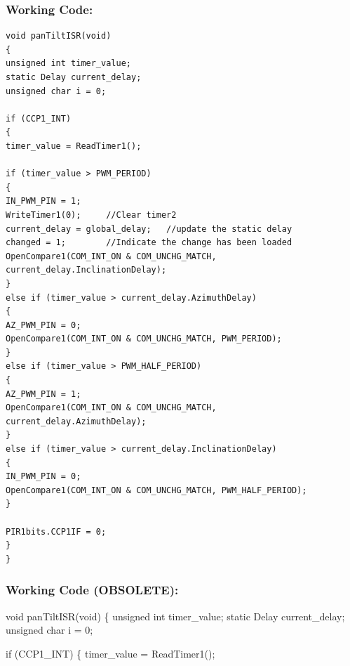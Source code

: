 \documentclass[]{report}
\begin{document}
\subsubsection{Working Code:}
\begin{lstlisting}
void panTiltISR(void)
{
unsigned int timer_value;
static Delay current_delay;
unsigned char i = 0;

if (CCP1_INT)
{
timer_value = ReadTimer1();

if (timer_value > PWM_PERIOD)
{
IN_PWM_PIN = 1;
WriteTimer1(0);     //Clear timer2
current_delay = global_delay;   //update the static delay
changed = 1;        //Indicate the change has been loaded
OpenCompare1(COM_INT_ON & COM_UNCHG_MATCH, current_delay.InclinationDelay);
}
else if (timer_value > current_delay.AzimuthDelay)
{
AZ_PWM_PIN = 0;
OpenCompare1(COM_INT_ON & COM_UNCHG_MATCH, PWM_PERIOD);
}
else if (timer_value > PWM_HALF_PERIOD)
{
AZ_PWM_PIN = 1;
OpenCompare1(COM_INT_ON & COM_UNCHG_MATCH, current_delay.AzimuthDelay);
}
else if (timer_value > current_delay.InclinationDelay)
{
IN_PWM_PIN = 0;
OpenCompare1(COM_INT_ON & COM_UNCHG_MATCH, PWM_HALF_PERIOD);
}

PIR1bits.CCP1IF = 0;
}
}
\end{lstlisting}

\subsubsection{Working Code (OBSOLETE):}
void panTiltISR(void)\newline
\{ \newline
	unsigned int timer\_value;\newline
	static Delay current\_delay;\newline
	unsigned char i = 0;\newline
	
	if (CCP1\_INT)\newline
	\{\newline
		timer\_value = ReadTimer1();\newline
		
\end{document}

